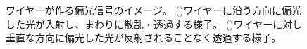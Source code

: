\documentclass[../../main.tex]{subfiles}
\begin{document}
\begin{figure}[H]
\begin{minipage}[b]{0.48\columnwidth}
        \subcaption{}
        \label{fig:wire_through}
    \end{minipage}
    \centering
    \caption{ワイヤーが作る偏光信号のイメージ。
             ()ワイヤーに沿う方向に偏光した光が入射し、まわりに散乱・透過する様子。
             ()ワイヤーに対し垂直な方向に偏光した光が反射されることなく透過する様子。
             }
    \label{fig:wire_polarization}
\end{figure}
\end{document}
